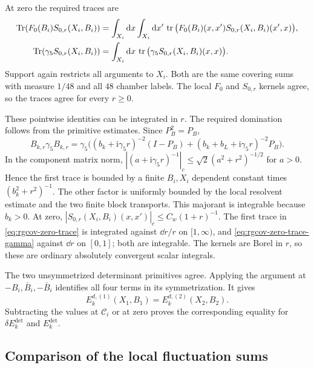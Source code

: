 At zero the required traces are
\begin{align}
 \operatorname{Tr}(F_0(B_i)S_{0,r}(X_i,B_i))
   &=\int_{X_i}\mathrm d x\int_{X_i}\mathrm d x'\,
          \operatorname{tr}\big(F_0(B_i)(x,x')S_{0,r}(X_i,B_i)(x',x)\big),
                                      \label{eq:rgcov-zero-trace}\\
 \operatorname{Tr}(\gamma_5S_{0,r}(X_i,B_i))
   &=\int_{X_i}\mathrm d x\,\operatorname{tr}\big(\gamma_5S_{0,r}(X_i,B_i)(x,x)\big).
                                      \label{eq:rgcov-zero-trace-gamma}
\end{align}
Support again restricts all arguments to $X_i$.
Both are the same covering sums with measure $1/48$
and all $48$ chamber labels. The local $F_0$ and
$S_{0,r}$ kernels agree, so the traces agree for
every $r\ge0$.

These pointwise identities can be integrated in $r$.
The required domination follows
from the primitive estimates. Since $P_B^2=P_B$,
\[
 B_{k,r}\gamma_5B_{k,r}
  =\gamma_5\big((b_k+\mathrm i\gamma_5r)^{-2}(I-P_B)
                +(b_k+b_L+\mathrm i\gamma_5r)^{-2}P_B\big).
\]
In the component matrix norm,
$|(a+\mathrm i\gamma_5r)^{-1}|_c
\le\sqrt2(a^2+r^2)^{-1/2}$ for $a>0$.
Hence the first trace is bounded by a finite
$B_i,X_i$ dependent constant times
$(b_k^2+r^2)^{-1}$.
The other factor is uniformly bounded by the local
resolvent estimate and the two finite block transports.
This majorant is integrable because $b_k>0$.
At zero, $|S_{0,r}(X_i,B_i)(x,x')|_c
\le C_w(1+r)^{-1}$.
The first trace in \eqref{eq:rgcov-zero-trace} is
integrated against $\dd r/r$ on $[1,\infty)$,
and \eqref{eq:rgcov-zero-trace-gamma} against $\dd r$
on $[0,1]$; both are integrable.
The kernels are Borel in $r$, so these are
ordinary absolutely convergent scalar integrals.

The two unsymmetrized determinant primitives agree.
Applying the argument at $-B_i,\bar B_i,-\bar B_i$
identifies all four terms in its symmetrization.
It gives
\begin{equation}\label{eq:rgcov-determinant-agreement}
              E_k^{d,(1)}(X_1,B_1)=E_k^{d,(2)}(X_2,B_2).
\end{equation}
Subtracting the values at $\mathscr C_i$ or at zero
proves the corresponding equality for
$\delta E_k^{\mathrm{det}}$ and $E_k^{\mathrm{det}}$.

\subsection{Comparison of the local fluctuation sums}
\label{subsec:rgcov-fluctuation-comparison}

